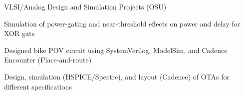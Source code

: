 \boldfont VLSI/Analog Design and Simulation Projects (OSU)
\lightfont
\begin{squarelist}
	\item Simulation of power-gating and near-threshold effects on power and delay for XOR gate
	\item Designed bike POV circuit using SystemVerilog, ModelSim, and Cadence Encounter (Place-and-route)
	\item Design, simulation (HSPICE/Spectre), and layout (Cadence) of OTAs for different specifications
\end{squarelist}
